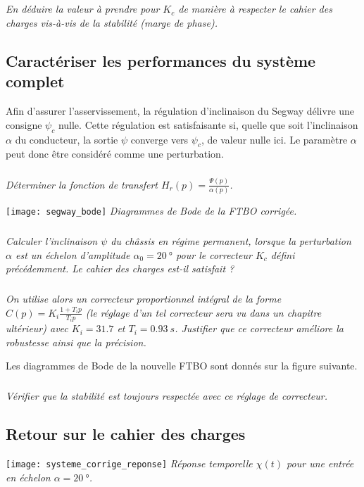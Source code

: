 \begin{multicols}{2}
\subparagraph{}\textit{En déduire la valeur à prendre pour $K_c$ de manière à respecter le cahier des charges vis-à-vis de la stabilité (marge de phase).}


\subsection*{Caractériser les performances du système complet}

Afin d'assurer l'asservissement, la régulation d'inclinaison du Segway\textregistered{} délivre une consigne $\psi_c$ nulle.  Cette régulation est satisfaisante si, quelle que soit l'inclinaison $\alpha$ du conducteur, la sortie $\psi$ converge vers $\psi_c$, de valeur nulle ici.  Le paramètre $\alpha$ peut donc être considéré comme une perturbation.



\subparagraph{}\textit{Déterminer la fonction de transfert $H_r(p)=\frac{\Psi(p)}{\alpha(p)}$.}

\begin{center}%
\texttt{[image: segway\_bode]}
\textit{Diagrammes de Bode de la FTBO corrigée.} \label{ex_Segway_bode}
\end{center}%

\subparagraph{}\textit{Calculer l'inclinaison $\psi$ du châssis en régime permanent, lorsque la perturbation $\alpha$ est un échelon d'amplitude $\alpha_0=\SI{20}{\degree}$ pour le correcteur $K_c$ défini précédemment. Le cahier des charges est-il satisfait ?}

\subparagraph{}\textit{On utilise alors un correcteur proportionnel intégral de la forme $C(p)=K_i \frac{1+T_i p}{T_i p}$ (le réglage d'un tel correcteur sera vu dans un chapitre ultérieur) avec $K_i=\num{31.7}$ et $T_i=\SI{0.93}{s}$. Justifier que ce correcteur améliore la robustesse ainsi que la précision.}

Les diagrammes de Bode de la nouvelle FTBO sont donnés sur la figure suivante.%


\subparagraph{}\textit{Vérifier que la stabilité est toujours respectée avec ce réglage de correcteur.}



\subsection*{Retour sur le cahier des charges}
\begin{center}
\texttt{[image: systeme\_corrige\_reponse]}
\textit{Réponse temporelle $\chi(t)$ pour une entrée en échelon $\alpha=\SI{20}{\degree}$.}
\label{ex_segway_reponse_temporelle}
\end{center}





\end{multicols}
